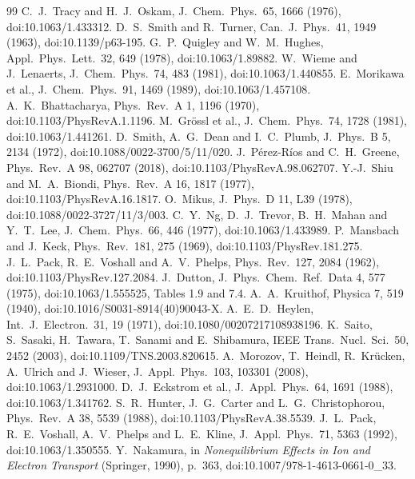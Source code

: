 \documentclass[11pt]{article}
\begin{document}
\begin{thebibliography}{99}
 C.~J.~Tracy and H.~J.~Oskam, J.\ Chem.\ Phys.\ 65, 1666 (1976), doi:10.1063/1.433312.
 D.~S.~Smith and R.~Turner, Can.\ J.\ Phys.\ 41, 1949 (1963), doi:10.1139/p63-195.
 G.~P.~Quigley and W.~M.~Hughes, Appl.\ Phys.\ Lett.\ 32, 649 (1978), doi:10.1063/1.89882.
 W.~Wieme and J.~Lenaerts, J.\ Chem.\ Phys.\ 74, 483 (1981), doi:10.1063/1.440855.
 E.~Morikawa et al., J.\ Chem.\ Phys.\ 91, 1469 (1989), doi:10.1063/1.457108.
 A.~K.~Bhattacharya, Phys.\ Rev.\ A 1, 1196 (1970), doi:10.1103/PhysRevA.1.1196.
 M.~Gr\"ossl et al., J.\ Chem.\ Phys.\ 74, 1728 (1981), doi:10.1063/1.441261.
 D.~Smith, A.~G.~Dean and I.~C.~Plumb, J.\ Phys.\ B 5, 2134 (1972), doi:10.1088/0022-3700/5/11/020.
 J.~P\'erez-R\'ios and C.~H.~Greene, Phys.\ Rev.\ A 98, 062707 (2018), doi:10.1103/PhysRevA.98.062707.
 Y.-J.~Shiu and M.~A.~Biondi, Phys.\ Rev.\ A 16, 1817 (1977), doi:10.1103/PhysRevA.16.1817.
 O.~Mikus, J.\ Phys.\ D 11, L39 (1978), doi:10.1088/0022-3727/11/3/003.
 C.~Y.~Ng, D.~J.~Trevor, B.~H.~Mahan and Y.~T.~Lee, J.\ Chem.\ Phys.\ 66, 446 (1977), doi:10.1063/1.433989.
 P.~Mansbach and J.~Keck, Phys.\ Rev.\ 181, 275 (1969), doi:10.1103/PhysRev.181.275.
 J.~L.~Pack, R.~E.~Voshall and A.~V.~Phelps, Phys.\ Rev.\ 127, 2084 (1962), doi:10.1103/PhysRev.127.2084.
 J.~Dutton, J.\ Phys.\ Chem.\ Ref.\ Data 4, 577 (1975), doi:10.1063/1.555525, Tables 1.9 and 7.4.
 A.~A.~Kruithof, Physica 7, 519 (1940), doi:10.1016/S0031-8914(40)90043-X.
 A.~E.~D.~Heylen, Int.\ J.\ Electron.\ 31, 19 (1971), doi:10.1080/00207217108938196.
 K.~Saito, S.~Sasaki, H.~Tawara, T.~Sanami and E.~Shibamura, IEEE Trans.\ Nucl.\ Sci.\ 50, 2452 (2003), doi:10.1109/TNS.2003.820615.
 A.~Morozov, T.~Heindl, R.~Kr\"ucken, A.~Ulrich and J.~Wieser, J.\ Appl.\ Phys.\ 103, 103301 (2008), doi:10.1063/1.2931000.
 D.~J.~Eckstrom et al., J.\ Appl.\ Phys.\ 64, 1691 (1988), doi:10.1063/1.341762.
 S.~R.~Hunter, J.~G.~Carter and L.~G.~Christophorou, Phys.\ Rev.\ A 38, 5539 (1988), doi:10.1103/PhysRevA.38.5539.
 J.~L.~Pack, R.~E.~Voshall, A.~V.~Phelps and L.~E.~Kline, J.\ Appl.\ Phys.\ 71, 5363 (1992), doi:10.1063/1.350555.
 Y.~Nakamura, in \emph{Nonequilibrium Effects in Ion and Electron Transport} (Springer, 1990), p.~363, doi:10.1007/978-1-4613-0661-0\_33.

\end{thebibliography}
\end{document}

